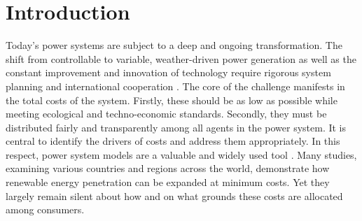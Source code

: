 \documentclass[11pt,twocolumn]{article}
\newcommand{\vpad}{\vspace{1mm}}
\newcommand{\generation}{g_{s,t}}
\newcommand{\nodalgeneration}[1][n]{g_{#1,t}}
\newcommand{\flow}{f_{\ell,t}}
\newcommand{\lmp}[1][n]{\lambda_{#1,t}}
\newcommand{\demand}[1][n]{d_{#1,t}}
\begin{document}


\section{Introduction}

Today's power systems are subject to a deep and ongoing transformation. The shift from controllable to variable, weather-driven power generation as well as the constant improvement and innovation of technology require rigorous system planning and international cooperation \cite{pfenninger_energy_2014,schlachtberger_benefits_2017}. The core of the challenge manifests in the total costs of the system. Firstly, these should be as low as possible while meeting ecological and techno-economic standards. Secondly, they must be distributed fairly and transparently among all agents in the power system. It is central to identify the drivers of costs and address them appropriately.  
In this respect, power system models are a valuable and widely used tool \cite{pfenninger_energy_2014,bazmi_sustainable_2011,pereira_generation_2017,brown_sectoral_2019}. Many studies, examining various countries and regions across the world, demonstrate how renewable energy penetration can be expanded at minimum costs. Yet they largely remain silent about how and on what grounds these costs are allocated among consumers. 
\end{document}
